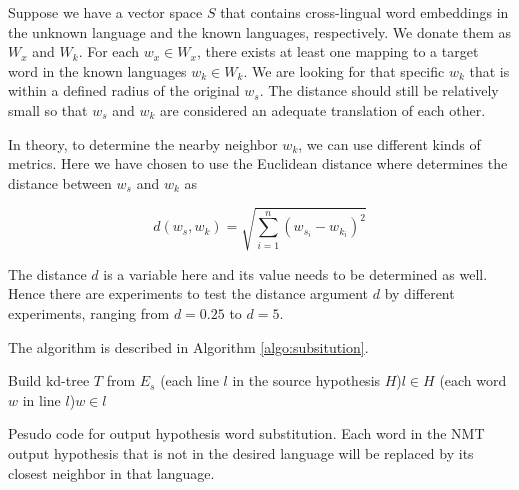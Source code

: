 \documentclass[thesis,fonts=libertine]{cluu}
\begin{document}
Suppose we have a vector space $S$ that contains cross-lingual word embeddings in the unknown language and the known languages, respectively. We donate them as $W_x$ and $W_k$. For each $w_x\in W_x$, there exists at least one mapping to a target word in the known languages $w_k \in W_k$. We are looking for that specific $w_k$ that is within a defined radius of the original $w_s$. The distance should still be relatively small so that $w_s$ and $w_k$ are considered an adequate translation of each other.

In theory, to determine the nearby neighbor $w_k$, we can use different kinds of metrics. Here we have chosen to use the Euclidean distance where determines the distance between $w_s$ and $w_k$ as

\begin{equation}
  d(w_s, w_k)=\sqrt{\sum_{i=1}^n{(w_{s_i}-w_{k_i})}^2}
\end{equation}

The distance $d$ is a variable here and its value needs to be determined as well. Hence there are experiments to test the distance argument $d$ by different experiments, ranging from $d=0.25$ to $d=5$.

The algorithm is described in Algorithm \ref{algo:subsitution}.

\begin{algorithm}[h]
  \SetAlgoLined

  Build kd-tree $T$ from $E_s$
  \For(each line $l$ in the source hypothesis $H$){$l \in H$}{
    \For(each word $w$ in line $l$){$w \in l$}{
    }
  }
  \caption{Pesudo code for output hypothesis word substitution. Each word in the NMT output hypothesis that is not in the desired language will be replaced by its closest neighbor in that language.}
  \label{algo:subsitution}
\end{algorithm}
\end{document}
